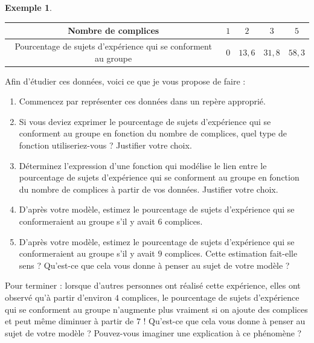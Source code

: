 \documentclass[a4paper,13pt]{scrreprt}
\theoremstyle{plain}
\theoremstyle{definition}
\newtheorem{exe}[subsection]{Exemple}
\begin{document}
\begin{exe}
	\begin{center}
		\begin{tabular}{|c|c|c|c|c|}
			\hline
			Nombre de complices & $1$ & $2$ & $3$ & $5$ \\
			\hline
			Pourcentage de sujets d'expérience qui se conforment au groupe & $0$ & $13,6$ & $31,8$ & $58,3$\\
			\hline
		\end{tabular}
	\end{center}
	Afin d'étudier ces données, voici ce que je vous propose de faire :
	\begin{enumerate}
		\item Commencez par représenter ces données dans un repère approprié.
		\item Si vous deviez exprimer le pourcentage de sujets d'expérience qui se conforment au groupe en fonction du nombre de complices, quel type de fonction utiliseriez-vous ? Justifier votre choix.
		\item Déterminez l'expression d'une fonction qui modélise le lien entre le pourcentage de sujets d'expérience qui se conforment au groupe en fonction du nombre de complices à partir de vos données. Justifier votre choix.
		\item D'après votre modèle, estimez le pourcentage de sujets d'expérience qui se conformeraient au groupe s'il y avait $6$ complices.
		\item D'après votre modèle, estimez le pourcentage de sujets d'expérience qui se conformeraient au groupe s'il y avait $9$ complices. Cette estimation fait-elle sens ? Qu'est-ce que cela vous donne à penser au sujet de votre modèle ?
	\end{enumerate}
	Pour terminer : lorsque d'autres personnes ont réalisé cette expérience, elles ont observé qu'à partir d'environ $4$ complices, le pourcentage de sujets d'expérience qui se conforment au groupe n'augmente plus vraiment si on ajoute des complices et peut même diminuer à partir de $7$ ! Qu'est-ce que cela vous donne à penser au sujet de votre modèle ? Pouvez-vous imaginer une explication à ce phénomène ?
\end{exe}
\end{document}
